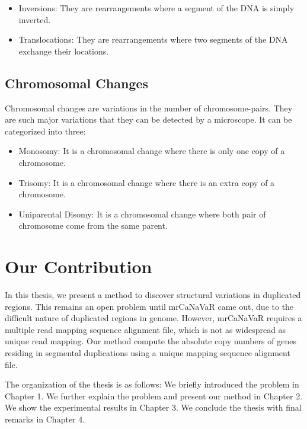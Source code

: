 \begin{itemize}
    \item Inversions: They are rearrangements where a segment of the DNA is simply inverted.
    \item Translocations: They are rearrangements where two segments of the DNA exchange their locations. 
\end{itemize}

\subsection{Chromosomal Changes}
Chromosomal changes are variations in the number of chromosome-pairs. They are such major variations that they can be detected by a microscope. It can be categorized into three:

\begin{itemize}
    \item Monosomy: It is a chromosomal change where there is only one copy of a chromosome.
    \item Trisomy: It is a chromosomal change where there is an extra copy of a chromosome.
    \item Uniparental Disomy: It is a chromosomal change where both pair of chromosome come from the same parent.
\end{itemize}

\section{Our Contribution}
In this thesis, we present a method to discover structural variations in duplicated regions. This remains an open problem until mrCaNaVaR \cite{alkan2009personalized} came out, due to the difficult nature of duplicated regions in genome. However, mrCaNaVaR requires a multiple read mapping sequence alignment file, which is not as widespread as unique read mapping. Our method compute the absolute copy numbers of genes residing in segmental duplications using a unique mapping sequence alignment file. 

The organization of the thesis is as follows: We briefly introduced the problem in Chapter 1. We further explain the problem and present our method in Chapter 2. We show the experimental results in Chapter 3. We conclude the thesis with final remarks in Chapter 4. 